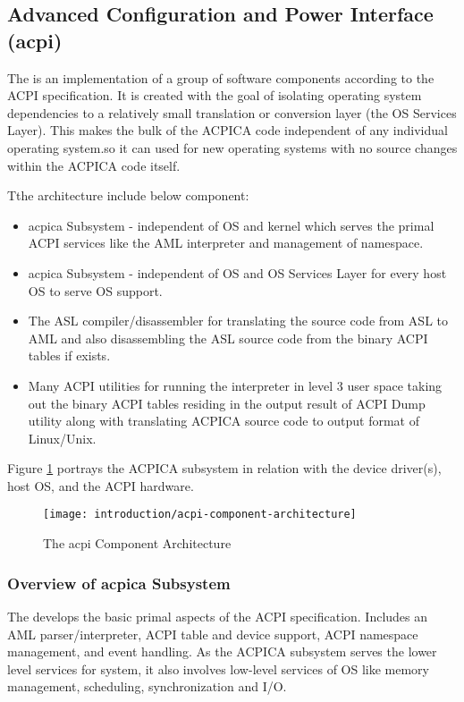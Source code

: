 \subsection{Advanced Configuration and Power Interface (\gls{acpi})}
The  is an implementation of a group of software components according to the ACPI specification. It is created with the goal of isolating operating system dependencies to a relatively small translation or conversion layer (the OS Services Layer). This makes the bulk of the ACPICA code independent of any individual operating system.so it can used for new operating systems with no source changes within the ACPICA code itself.

Tthe architecture include below component:
\begin{itemize}
  \item \gls{acpica} Subsystem - independent of OS and kernel which serves the primal ACPI services like the AML interpreter and management of namespace.
  \item \gls{acpica} Subsystem - independent of OS and OS Services Layer for every host OS to serve OS support.
  \item The ASL compiler/disassembler for translating the source code from ASL to AML and also disassembling the ASL source code from the binary ACPI tables if exists.
  \item Many ACPI utilities for running the interpreter in level 3 user space taking out the binary ACPI tables residing in the output result of ACPI Dump utility along with translating ACPICA source code to output format of Linux/Unix.
\end{itemize}

Figure \ref{fig:introduction-acpi-component-architecture} portrays the ACPICA subsystem in relation with the device driver(s), host OS, and the ACPI hardware.

\begin{figure}[!htbp]
	\centering
	\texttt{[image: introduction/acpi-component-architecture]}
	\caption{The \gls{acpi} Component Architecture}\label{fig:introduction-acpi-component-architecture}
\end{figure}

\subsubsection{Overview of \gls{acpica} Subsystem}
The  develops the basic primal aspects of the ACPI specification. Includes an AML parser/interpreter, ACPI table and device support, ACPI namespace management, and event handling. As the ACPICA subsystem serves the lower level services for system, it also involves low-level services of OS like memory management, scheduling, synchronization and I/O.

